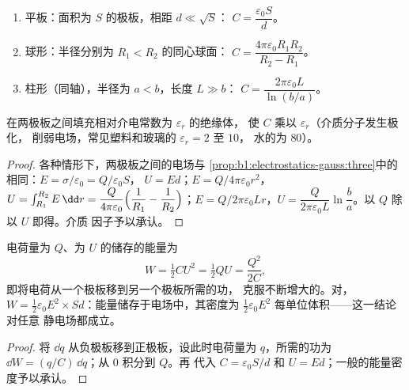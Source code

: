 \begin{proposition}[三种电容器]\label{prop:b1:potential-capacitors:three}
\begin{enumerate}
  \item 平板：面积为 $S$ 的极板，相距 $d \ll \sqrt S$：
        $C = \dfrac{\varepsilon_0S}{d}$。
  \item 球形：半径分别为 $R_1 < R_2$ 的同心球面：
        $C = \dfrac{4\pi\varepsilon_0R_1R_2}{R_2 - R_1}$。
  \item 柱形（同轴），半径为 $a < b$，长度 $L \gg b$：
        $C = \dfrac{2\pi\varepsilon_0L}{\ln(b/a)}$。
\end{enumerate}
在两极板之间填充相对介电常数为 $\varepsilon_r$ 的绝缘体，
使 $C$ 乘以 $\varepsilon_r$（介质分子发生极化，
削弱电场，常见塑料和玻璃的 $\varepsilon_r = 2$ 至 $10$，
水的为 $80$）。
\end{proposition}

\begin{proof}
各种情形下，两极板之间的电场与
\cref{prop:b1:electrostatics-gauss:three}中的相同：$E = \sigma/\varepsilon_0 = Q/\varepsilon_0S$，
$U = Ed$；$E = Q/4\pi\varepsilon_0r^2$，$U = \int_{R_1}^{R_2}E\,\dd r = \dfrac{Q}{4\pi\varepsilon_0}
\Bigl(\dfrac1{R_1} - \dfrac1{R_2}\Bigr)$；$E = Q/2\pi\varepsilon_0Lr$，$U =
\dfrac{Q}{2\pi\varepsilon_0L}\ln\dfrac ba$。以 $Q$ 除以 $U$ 即得。介质
因子予以承认。
\end{proof}

\begin{theorem}[电容器的能量]\label{thm:b1:potential-capacitors:energy}
电荷量为 $Q$、为 $U$ 的储存的能量为
\[
W = \tfrac12 CU^2 = \tfrac12 QU = \frac{Q^2}{2C} ,
\]
即将电荷从一个极板移到另一个极板所需的功，
克服不断增大的。对，$W = \tfrac12\varepsilon_0E^2
\times Sd$：能量储存于电场中，其密度为 $\tfrac12\varepsilon_0E^2$
每单位体积——这一结论对任意
静电场都成立。
\end{theorem}

\begin{proof}
将 $\dd q$ 从负极板移到正极板，设此时电荷量为
$q$，所需的功为 $\dd W = (q/C)\,\dd q$；从 $0$ 积分到 $Q$。再
代入 $C = \varepsilon_0S/d$ 和 $U = Ed$；一般的能量密度予以承认。
\end{proof}

